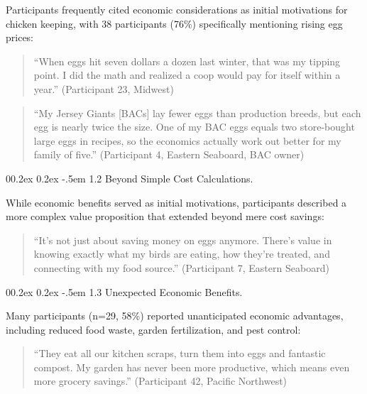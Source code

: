 \documentclass[
  man,
  floatsintext,
  longtable,
  nolmodern,
  notxfonts,
  notimes,
  colorlinks=true,linkcolor=blue,citecolor=blue,urlcolor=blue]{apa7}
\makeatletter
\renewcommand{\paragraph}{\@startsection{paragraph}{4}{\parindent}%
	{0\baselineskip \@plus 0.2ex \@minus 0.2ex}%
	{-.5em}%
	{\normalfont\normalsize\bfseries\typesectitle}}
\makeatother
\begin{document}
Participants frequently cited economic considerations as initial
motivations for chicken keeping, with 38 participants (76\%)
specifically mentioning rising egg prices:

\begin{quote}
``When eggs hit seven dollars a dozen last winter, that was my tipping
point. I did the math and realized a coop would pay for itself within a
year.'' (Participant 23, Midwest)
\end{quote}

\begin{quote}
``My Jersey Giants {[}BACs{]} lay fewer eggs than production breeds, but
each egg is nearly twice the size. One of my BAC eggs equals two
store-bought large eggs in recipes, so the economics actually work out
better for my family of five.'' (Participant 4, Eastern Seaboard, BAC
owner)
\end{quote}

\paragraph{1.2 Beyond Simple Cost
Calculations.}\label{beyond-simple-cost-calculations}

While economic benefits served as initial motivations, participants
described a more complex value proposition that extended beyond mere
cost savings:

\begin{quote}
``It's not just about saving money on eggs anymore. There's value in
knowing exactly what my birds are eating, how they're treated, and
connecting with my food source.'' (Participant 7, Eastern Seaboard)
\end{quote}

\paragraph{1.3 Unexpected Economic
Benefits.}\label{unexpected-economic-benefits}

Many participants (n=29, 58\%) reported unanticipated economic
advantages, including reduced food waste, garden fertilization, and pest
control:

\begin{quote}
``They eat all our kitchen scraps, turn them into eggs and fantastic
compost. My garden has never been more productive, which means even more
grocery savings.'' (Participant 42, Pacific Northwest)
\end{quote}
\end{document}
